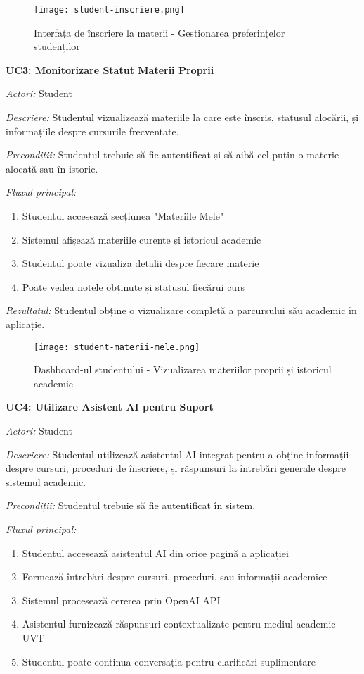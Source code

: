 \documentclass[12pt,a4paper]{report}
\begin{document}
\begin{figure}[H]
\centering
\texttt{[image: student-inscriere.png]}
\caption{Interfața de înscriere la materii - Gestionarea preferințelor studenților}
\label{fig:student-inscriere}
\end{figure}

\textbf{UC3: Monitorizare Statut Materii Proprii}

\textit{Actori:} Student

\textit{Descriere:} Studentul vizualizează materiile la care este înscris, statusul alocării, și informațiile despre cursurile frecventate.

\textit{Precondiții:} Studentul trebuie să fie autentificat și să aibă cel puțin o materie alocată sau în istoric.

\textit{Fluxul principal:}
\begin{enumerate}
\item Studentul accesează secțiunea "Materiile Mele"
\item Sistemul afișează materiile curente și istoricul academic
\item Studentul poate vizualiza detalii despre fiecare materie
\item Poate vedea notele obținute și statusul fiecărui curs
\end{enumerate}

\textit{Rezultatul:} Studentul obține o vizualizare completă a parcursului său academic în aplicație.

\begin{figure}[H]
\centering
\texttt{[image: student-materii-mele.png]}
\caption{Dashboard-ul studentului - Vizualizarea materiilor proprii și istoricul academic}
\label{fig:student-materii-mele}
\end{figure}

\textbf{UC4: Utilizare Asistent AI pentru Suport}

\textit{Actori:} Student

\textit{Descriere:} Studentul utilizează asistentul AI integrat pentru a obține informații despre cursuri, proceduri de înscriere, și răspunsuri la întrebări generale despre sistemul academic.

\textit{Precondiții:} Studentul trebuie să fie autentificat în sistem.

\textit{Fluxul principal:}
\begin{enumerate}
\item Studentul accesează asistentul AI din orice pagină a aplicației
\item Formează întrebări despre cursuri, proceduri, sau informații academice
\item Sistemul procesează cererea prin OpenAI API
\item Asistentul furnizează răspunsuri contextualizate pentru mediul academic UVT
\item Studentul poate continua conversația pentru clarificări suplimentare
\end{enumerate}
\end{document}
